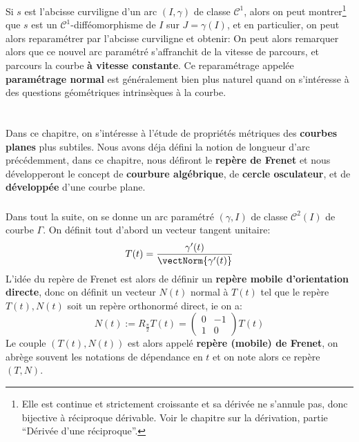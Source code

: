 \subsection*{}
Si \(s\) est l'abcisse curviligne d'un arc \((I, \gamma)\) de classe \(\mathcal{C}^1\), alors on peut montrer\footnote[3]{Elle est continue et strictement croissante et sa dérivée ne s'annule pas, donc bijective à réciproque dérivable. Voir le chapitre sur la dérivation, partie ``Dérivée d'une réciproque''.} que \(s\) est un \(\mathcal{C}^1\)-difféomorphisme de \(I\) sur \(J = \gamma(I)\), et en particulier, on peut alors reparamétrer par l'abcisse curviligne et obtenir:
On peut alors remarquer alors que ce nouvel arc paramétré s'affranchit de la vitesse de parcours, et parcours la courbe \textbf{à vitesse constante}. Ce reparamétrage appelée \textbf{paramétrage normal} est généralement bien plus naturel quand on s'intéresse à des questions géométriques intrinsèques à la courbe.
\chapter*{} %
Dans ce chapitre, on s'intéresse à l'étude de propriétés métriques des \textbf{courbes planes} plus subtiles. Nous avons déja défini la notion de longueur d'arc précédemment, dans ce chapitre, nous défiront le \textbf{repère de Frenet} et nous développeront le concept de \textbf{courbure algébrique}, de \textbf{cercle osculateur}, et de \textbf{développée} d'une courbe plane.

\subsection*{}
Dans tout la suite, on se donne un arc paramétré \((\gamma, I)\) de classe \(\mathcal{C}^2(I)\) de courbe \(\Gamma\). On définit tout d'abord un vecteur tangent unitaire:
\[
   T(t) = \frac{\gamma'(t)}{\vectNorm{\gamma'(t)}}
\]
L'idée du repère de Frenet est alors de définir un \textbf{repère mobile d'orientation directe}, donc on définit un vecteur \(N(t)\) normal à \(T(t)\) tel que le repère \(T(t), N(t)\) soit un repère orthonormé direct, ie on a:
\[
   N(t) := R_\frac{\pi}{2}T(t) = \begin{pmatrix} 0 & -1\\ 1 & 0\end{pmatrix} T(t) 
\]
Le couple \((T(t), N(t))\) est alors appelé \textbf{repère (mobile) de Frenet}, on abrège souvent les notations de dépendance en \(t\) et on note alors ce repère \((T, N)\).
